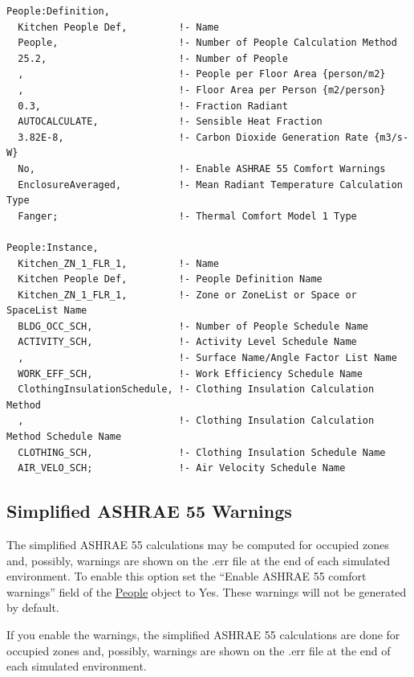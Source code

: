 \begin{lstlisting}
People:Definition,
  Kitchen People Def,         !- Name
  People,                     !- Number of People Calculation Method
  25.2,                       !- Number of People
  ,                           !- People per Floor Area {person/m2}
  ,                           !- Floor Area per Person {m2/person}
  0.3,                        !- Fraction Radiant
  AUTOCALCULATE,              !- Sensible Heat Fraction
  3.82E-8,                    !- Carbon Dioxide Generation Rate {m3/s-W}
  No,                         !- Enable ASHRAE 55 Comfort Warnings
  EnclosureAveraged,          !- Mean Radiant Temperature Calculation Type
  Fanger;                     !- Thermal Comfort Model 1 Type

People:Instance,
  Kitchen_ZN_1_FLR_1,         !- Name
  Kitchen People Def,         !- People Definition Name
  Kitchen_ZN_1_FLR_1,         !- Zone or ZoneList or Space or SpaceList Name
  BLDG_OCC_SCH,               !- Number of People Schedule Name
  ACTIVITY_SCH,               !- Activity Level Schedule Name
  ,                           !- Surface Name/Angle Factor List Name
  WORK_EFF_SCH,               !- Work Efficiency Schedule Name
  ClothingInsulationSchedule, !- Clothing Insulation Calculation Method
  ,                           !- Clothing Insulation Calculation Method Schedule Name
  CLOTHING_SCH,               !- Clothing Insulation Schedule Name
  AIR_VELO_SCH;               !- Air Velocity Schedule Name
\end{lstlisting}

\subsection{Simplified ASHRAE 55 Warnings}\label{simplified-ashrae-55-warnings}

The simplified ASHRAE 55 calculations may be computed for occupied zones and, possibly, warnings are shown on the .err file at the end of each simulated environment. To enable this option set the ``Enable ASHRAE 55 comfort warnings'' field of the \hyperref[people]{People} object to Yes. These warnings will not be generated by default.

If you enable the warnings, the simplified ASHRAE 55 calculations are done for occupied zones and, possibly, warnings are shown on the .err file at the end of each simulated environment.


